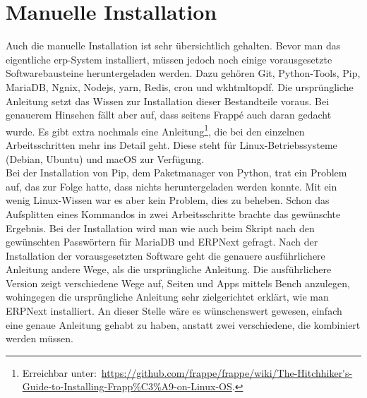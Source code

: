\section{Manuelle Installation}
Auch die manuelle Installation ist sehr übersichtlich gehalten. Bevor man das eigentliche \gls{erp}-System installiert, müssen jedoch noch einige vorausgesetzte Softwarebausteine heruntergeladen werden. Dazu gehören Git, Python-Tools, Pip, MariaDB, Ngnix, Nodejs, yarn, Redis, cron und wkhtmltopdf. Die ursprüngliche Anleitung setzt das Wissen zur Installation dieser Bestandteile voraus. Bei genauerem Hinsehen fällt aber auf, dass seitens Frappé auch daran gedacht wurde. Es gibt extra nochmals eine Anleitung\footnote{Erreichbar unter:\ \url{https://github.com/frappe/frappe/wiki/The-Hitchhiker's-Guide-to-Installing-Frapp\%C3\%A9-on-Linux-OS}.}, die bei den einzelnen Arbeitsschritten mehr ins Detail geht. Diese steht für Linux-Betriebssysteme (Debian, Ubuntu) und macOS zur Verfügung. \\
Bei der Installation von Pip, dem Paketmanager von Python, trat ein Problem auf, das zur Folge hatte, dass nichts heruntergeladen werden konnte. Mit ein wenig Linux-Wissen war es aber kein Problem, dies zu beheben. Schon das Aufsplitten eines Kommandos in zwei Arbeitsschritte brachte das gewünschte Ergebnis. Bei der Installation wird man wie auch beim Skript nach den gewünschten Passwörtern für MariaDB und ERPNext gefragt.
Nach der Installation der vorausgesetzten Software geht die genauere ausführlichere Anleitung andere Wege, als die ursprüngliche Anleitung.
Die ausführlichere Version zeigt verschiedene Wege auf, Seiten und Apps mittels Bench anzulegen, wohingegen die ursprüngliche Anleitung sehr zielgerichtet erklärt, wie man ERPNext installiert. An dieser Stelle wäre es wünschenswert gewesen, einfach eine genaue Anleitung gehabt zu haben, anstatt zwei verschiedene, die kombiniert werden müssen.

